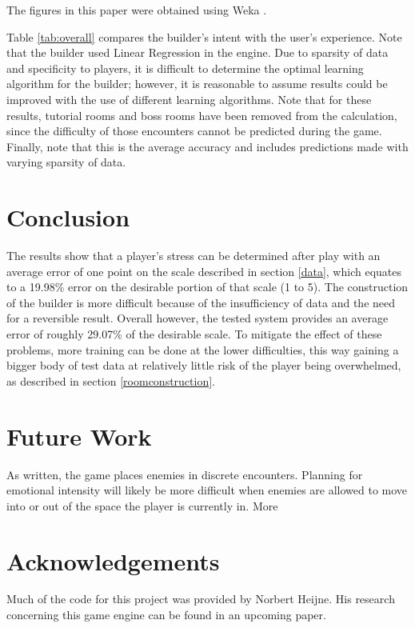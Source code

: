 \documentclass[a4paper]{article}
\begin{document}
\begin{multicols*}{2}
The figures in this paper were obtained using Weka \cite{weka}.

Table \ref{tab:overall} compares the builder's intent with the user's experience. Note that the builder used Linear Regression in the engine.
Due to sparsity of data and specificity to players, it is difficult to determine the optimal learning algorithm for the builder; however, it is reasonable to assume results could be improved with the use of different learning algorithms. 
Note that for these results, tutorial rooms and boss rooms have been removed from the calculation, since the difficulty of those encounters cannot be predicted during the game.
Finally, note that this is the average accuracy and includes predictions made with varying sparsity of data.

\section{Conclusion}
The results show that a player's stress can be determined after play with an average error of one point on the scale described in section \ref{data}, which equates to a 19.98\% error on the desirable portion of that scale (1 to 5).
The construction of the builder is more difficult because of the insufficiency of data and the need for a reversible result. Overall however, the tested system provides an average error of roughly 29.07\% of the desirable scale. 
To mitigate the effect of these problems, more training can be done at the lower difficulties, this way gaining a bigger body of test data at relatively little risk of the player being overwhelmed, as described in section \ref{roomconstruction}.

\section{Future Work}
As written, the game places enemies in discrete encounters. Planning for emotional intensity will likely be more difficult when enemies are allowed to move into or out of the space the player is currently in. More 

\section{Acknowledgements}
Much of the code for this project was provided by Norbert Heijne. His research concerning this game engine can be found in an upcoming paper.


\begin{thebibliography}{9}


\end{thebibliography}
\end{multicols*}
\end{document}
